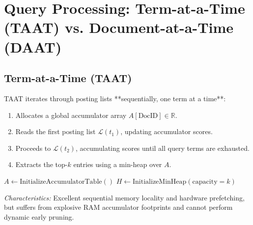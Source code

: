 \FloatBarrier
\section[Query Processing: TAAT vs. DAAT]{Query Processing: Term-at-a-Time (TAAT) vs. Document-at-a-Time (DAAT)}
\label{sec:taat-vs-daat-en}

\subsection{Term-at-a-Time (TAAT)}
TAAT iterates through posting lists **sequentially, one term at a time**:
\begin{enumerate}
    \item Allocates a global accumulator array $A[\text{DocID}] \in \mathbb{R}$.
    \item Reads the first posting list $\mathcal{L}(t_1)$, updating accumulator scores.
    \item Proceeds to $\mathcal{L}(t_2)$, accumulating scores until all query terms are exhausted.
    \item Extracts the top-$k$ entries using a min-heap over $A$.
\end{enumerate}

\begin{algorithm}[H]
\caption{Term-at-a-Time (TAAT)}
\label{alg:taat-en}

$A \gets \text{InitializeAccumulatorTable}()$\;
$H \gets \text{InitializeMinHeap}(\text{capacity}=k)$\;
\;
\end{algorithm}

\textit{Characteristics:} Excellent sequential memory locality and hardware prefetching, but suffers from explosive RAM accumulator footprints and cannot perform dynamic early pruning.

